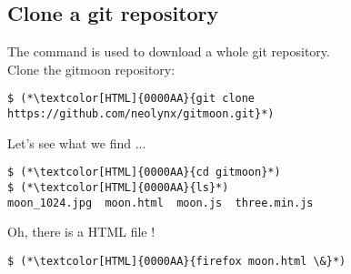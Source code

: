 

\subsection{Clone a git repository}
\begin{frame}[fragile]
  \subslidetitle
  The command  is used to download a whole git repository.
  \\
  \vspace{1em}
  Clone the gitmoon repository:
  \begin{lstlisting}
$ (*\textcolor[HTML]{0000AA}{git clone https://github.com/neolynx/gitmoon.git}*)
  \end{lstlisting}


  Let's see what we find ...
  \begin{lstlisting}
$ (*\textcolor[HTML]{0000AA}{cd gitmoon}*)
$ (*\textcolor[HTML]{0000AA}{ls}*)
moon_1024.jpg  moon.html  moon.js  three.min.js
  \end{lstlisting}

  Oh, there is a HTML file !
  \begin{lstlisting}
$ (*\textcolor[HTML]{0000AA}{firefox moon.html \&}*)
  \end{lstlisting}

\end{frame}

